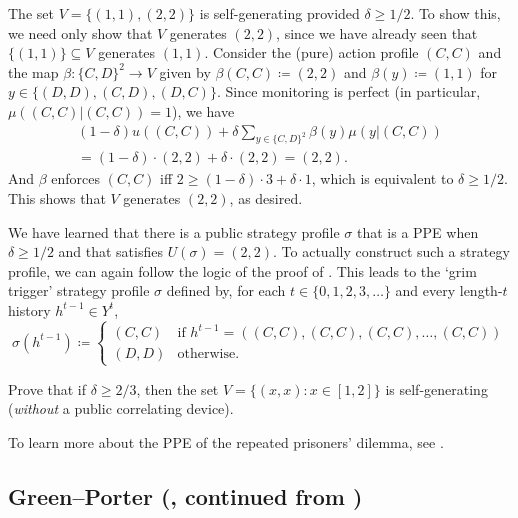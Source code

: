 The set $V = \{ (1,1), (2,2) \}$ is self-generating provided $\delta \geq 1/2$. To show this, we need only show that $V$ generates $(2,2)$, since we have already seen that $\{(1,1)\} \subseteq V$ generates $(1,1)$. Consider the (pure) action profile $(C,C)$ and the map $\beta : \{C,D\}^2 \to V$ given by $\beta(C,C) \coloneqq (2,2)$ and $\beta(y) \coloneqq (1,1)$ for $y \in \{ (D,D), (C,D), (D,C) \}$. Since monitoring is perfect (in particular, $\mu((C,C)|(C,C))=1$), we have
%
\begin{multline*}
	(1-\delta) u((C,C))
	+ \delta \sum_{y \in \{C,D\}^2} \beta(y) \mu(y|(C,C))
	\\
	= (1-\delta) \cdot (2,2)
	+ \delta \cdot (2,2)
	= (2,2) .
\end{multline*}
%
And $\beta$ enforces $(C,C)$ iff $2 \geq (1-\delta) \cdot 3 + \delta \cdot 1$, which is equivalent to $\delta \geq 1/2$. This shows that $V$ generates $(2,2)$, as desired.

We have learned that there is a public strategy profile $\sigma$ that is a PPE when $\delta \geq 1/2$ and that satisfies $U(\sigma)=(2,2)$. To actually construct such a strategy profile, we can again follow the logic of the proof of . This leads to the `grim trigger' strategy profile $\sigma$ defined by, for each $t \in \{0,1,2,3,\dots\}$ and every length-$t$ history $h^{t-1} \in Y^t$,
%
\begin{equation*}
	\sigma\left( h^{t-1} \right) \coloneqq
	\begin{cases}
		(C,C) & \text{if $h^{t-1} = ((C,C),(C,C),(C,C),\dots,(C,C))$} \\
		(D,D) & \text{otherwise.}
	\end{cases}
\end{equation*}

\begin{exercise}
	\label{exercise:rep_pris_selfgen}
	Prove that if $\delta \geq 2/3$, then the set $V = \{ (x,x) : x \in [1,2] \}$ is self-generating (\emph{without} a public correlating device).
\end{exercise}

To learn more about the PPE of the repeated prisoners' dilemma, see \textcite[sections~7.2 and 7.7]{MailathSamuelson2006}.



\subsection{\texorpdfstring{Green--Porter (, continued from )}{Green--Porter (Example \ref{example:greenporter}, continued from p. \pageref{example:greenporter})}}
\label{aps:examples:greenporter_gen}

